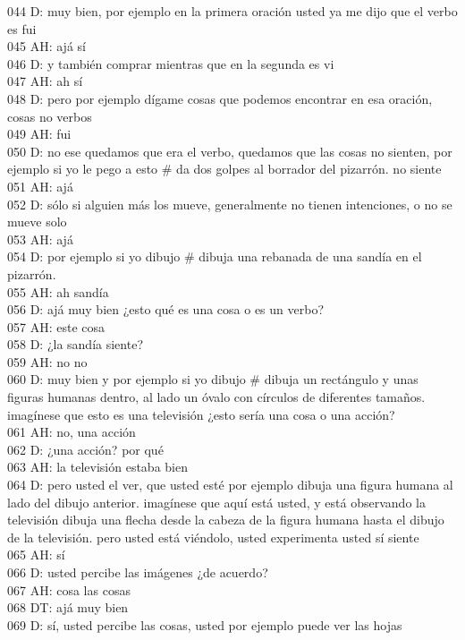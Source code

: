 044 D: muy bien, por ejemplo en la primera oración usted ya me dijo que el verbo es fui\\
045 AH: ajá sí\\
046 D: y también comprar mientras que en la segunda es vi\\
047 AH: ah sí\\
048 D: pero por ejemplo dígame cosas que podemos encontrar en esa oración, cosas no verbos\\
049 AH: fui\\
050 D: no ese quedamos que era el verbo, quedamos que las cosas no sienten, por ejemplo si yo le pego a esto \# da dos golpes al borrador del pizarrón. no siente\\
051 AH: ajá\\
052 D: sólo si alguien más los mueve, generalmente no tienen intenciones, o no se mueve solo\\
053 AH: ajá\\
054 D: por ejemplo si yo dibujo \# dibuja una rebanada de una sandía en el pizarrón.\\
055 AH: ah sandía\\
056 D: ajá muy bien ¿esto qué es una cosa o es un verbo?\\
057 AH: este cosa\\
058 D: ¿la sandía siente?\\
059 AH: no no\\
060 D: muy bien y por ejemplo si yo dibujo \# dibuja un rectángulo y unas figuras humanas dentro, al lado un óvalo con círculos de diferentes tamaños. imagínese que esto es una televisión ¿esto sería una cosa o una acción?\\
061 AH: no, una acción\\
062 D: ¿una acción? por qué\\
063 AH: la televisión estaba bien\\
064 D: pero usted el ver, que usted esté por ejemplo  dibuja una figura humana al lado del dibujo anterior. imagínese que aquí está usted, y está observando la televisión  dibuja una flecha desde la cabeza de la figura humana hasta el dibujo de la televisión. pero usted está viéndolo, usted experimenta usted sí siente\\
065 AH: sí\\
066 D: usted percibe las imágenes ¿de acuerdo?\\
067 AH: cosa las cosas\\
068 DT: ajá muy bien\\
069 D: sí, usted percibe las cosas, usted por ejemplo puede ver las hojas\\

